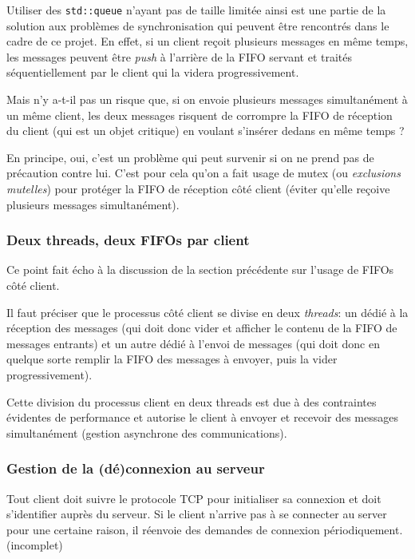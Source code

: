 \documentclass{article}
\begin{document}
\noindent Utiliser des \texttt{std::queue} n'ayant pas de taille limitée ainsi est une partie de la solution aux problèmes de synchronisation qui peuvent être rencontrés dans le cadre de ce projet. En effet, si un client reçoit plusieurs messages en même temps, les messages peuvent être \textit{push} à l'arrière de la FIFO servant et traités séquentiellement par le client qui la videra progressivement.


 \noindent Mais n'y a-t-il pas un risque que, si on envoie plusieurs messages simultanément à un même client, les deux messages risquent de corrompre la FIFO de réception du client (qui est un objet critique) en voulant s'insérer dedans en même temps ?


\noindent En principe, oui, c'est un problème qui peut survenir si on ne prend pas de précaution contre lui. C'est pour cela qu'on a fait usage de mutex (ou \textit{exclusions mutelles}) \cite{std::mutex} pour protéger la FIFO de réception côté client (éviter qu'elle reçoive plusieurs messages simultanément).


\subsubsection{Deux threads, deux FIFOs par client}
Ce point fait écho à la discussion de la section précédente sur l'usage de FIFOs côté client.

\noindent Il faut préciser que le processus côté client se divise en deux \textit{threads}: un dédié à la réception des messages (qui doit donc vider et afficher le contenu de la FIFO de messages entrants) et un autre dédié à l'envoi de messages (qui doit donc en quelque sorte remplir la FIFO des messages à envoyer, puis la vider progressivement).

\noindent Cette division du processus client en deux threads est due à des contraintes évidentes de performance et autorise le client à envoyer et recevoir des messages simultanément (gestion asynchrone des communications).

\subsubsection{Gestion de la (dé)connexion au serveur}
\noindent Tout client doit suivre le protocole TCP \cite{TCP-IP} pour initialiser sa connexion et doit s'identifier auprès du serveur. Si le client n'arrive pas à se connecter au server pour une certaine raison, il réenvoie des demandes de connexion périodiquement.
(incomplet)
\end{document}
